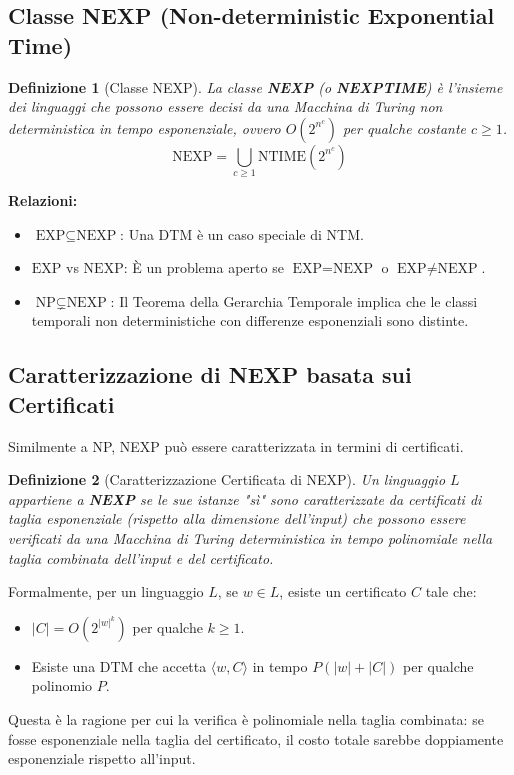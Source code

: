 \documentclass[a4paper]{article}
\newtheorem{definition}{Definizione}
\begin{document}
\subsection{Classe NEXP (Non-deterministic Exponential Time)}
\begin{definition}[Classe NEXP]
La classe \textbf{NEXP} (o \textbf{NEXPTIME}) è l'insieme dei linguaggi che possono essere decisi da una Macchina di Turing non deterministica in tempo esponenziale, ovvero $O(2^{n^c})$ per qualche costante $c \ge 1$.
\[
\text{NEXP} = \bigcup_{c \ge 1} \text{NTIME}(2^{n^c})
\]
\end{definition}

\textbf{Relazioni:}
\begin{itemize}
    \item $\text{EXP} \subseteq \text{NEXP}$: Una DTM è un caso speciale di NTM.
    \item $\text{EXP}$ vs $\text{NEXP}$: È un problema aperto se $\text{EXP} = \text{NEXP}$ o $\text{EXP} \neq \text{NEXP}$.
    \item $\text{NP} \subsetneq \text{NEXP}$: Il Teorema della Gerarchia Temporale implica che le classi temporali non deterministiche con differenze esponenziali sono distinte.
\end{itemize}

\subsection{Caratterizzazione di NEXP basata sui Certificati}
Similmente a NP, NEXP può essere caratterizzata in termini di certificati.
\begin{definition}[Caratterizzazione Certificata di NEXP]
Un linguaggio $L$ appartiene a \textbf{NEXP} se le sue istanze "sì" sono caratterizzate da certificati di \textit{taglia esponenziale} (rispetto alla dimensione dell'input) che possono essere verificati da una Macchina di Turing deterministica in \textit{tempo polinomiale} nella taglia combinata dell'input e del certificato.
\end{definition}
Formalmente, per un linguaggio $L$, se $w \in L$, esiste un certificato $C$ tale che:
\begin{itemize}
    \item $|C| = O(2^{|w|^k})$ per qualche $k \ge 1$.
    \item Esiste una DTM che accetta $\langle w, C \rangle$ in tempo $P(|w| + |C|)$ per qualche polinomio $P$.
\end{itemize}
Questa è la ragione per cui la verifica è polinomiale nella taglia combinata: se fosse esponenziale nella taglia del certificato, il costo totale sarebbe doppiamente esponenziale rispetto all'input.
\end{document}
